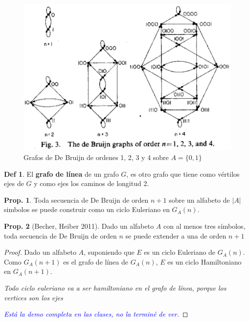 \documentclass{report}
\theoremstyle{definition} %
\newtheorem{proposition}{Prop.}[chapter]
\newtheorem*{definition*}{Def}
\begin{document}
\begin{figure}[H]
    \centering
    \includegraphics[scale=0.3]{img/2_de_brujin_ord_1234.png}
    \caption{Grafos de De Bruijn de ordenes 1, 2, 3 y 4 sobre $A = \{0, 1\}$}
\end{figure}

\begin{definition*}
    El \textbf{grafo de línea} de un grafo $G$, es otro grafo que tiene como
    vértilos ejes de $G$ y como ejes los caminos de longitud 2.
\end{definition*}


\begin{proposition}
    Toda secuencia de De Bruijn de orden $n+1$ sobre un alfabeto de $|A|$
    simbolos se puede construir como un ciclo Euleriano en $G_A(n)$.
\end{proposition}

\begin{proposition}[Becher, Heiber 2011]\label{prop:de-brujin-extend}
    Dado un alfabeto $A$ con al menos tres símbolos, toda secuencia de De
    Bruijn de orden $n$ se puede extender a una de orden $n + 1$
\end{proposition}
\begin{proof}
    Dado un alfabeto $A$, suponiendo que $E$ es un ciclo Euleriano de $G_A(n)$.
    Como $G_A(n + 1)$ es el grafo de línea de $G_A(n)$, $E$ es un ciclo
    Hamiltoniano en $G_A(n+1)$.

    \textit{Todo ciclo euleriano va a ser hamiltoniano en el grafo de línea, 
    porque los vertices son los ejes}
    
    \textit{\textcolor{blue}{Está la demo completa en las clases, no la terminé
    de ver.}}

\end{proof}
\end{document}

